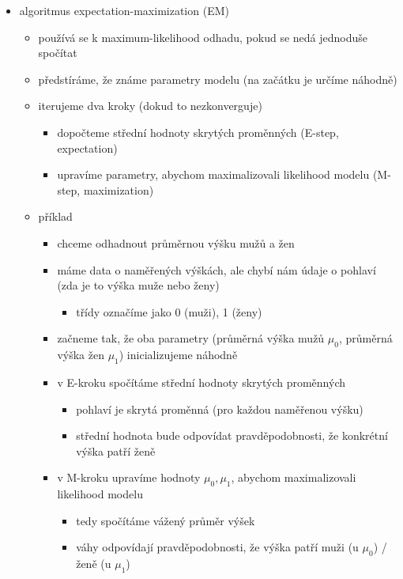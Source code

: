 \begin{itemize}
\begin{itemize}
\begin{itemize}
\begin{itemize}
\item $p(z\mid\mathrm{data})=\sum_h p(z\mid h)\cdot p(h\mid\mathrm{data})$
\end{itemize}
\end{itemize}
\item algoritmus expectation-maximization (EM)
\begin{itemize}
\item používá se k maximum-likelihood odhadu, pokud se nedá jednoduše spočítat
\item předstíráme, že známe parametry modelu (na začátku je určíme náhodně)
\item iterujeme dva kroky (dokud to nezkonverguje)
\begin{itemize}
\item dopočteme střední hodnoty skrytých proměnných (E-step, expectation)
\item upravíme parametry, abychom maximalizovali likelihood modelu (M-step, maximization)
\end{itemize}
\item příklad
\begin{itemize}
\item chceme odhadnout průměrnou výšku mužů a žen
\item máme data o naměřených výškách, ale chybí nám údaje o pohlaví (zda je to výška muže nebo ženy)
\begin{itemize}
\item třídy označíme jako 0 (muži), 1 (ženy)
\end{itemize}
\item začneme tak, že oba parametry (průměrná výška mužů $\mu_0$, průměrná výška žen $\mu_1$) inicializujeme náhodně
\item v E-kroku spočítáme střední hodnoty skrytých proměnných
\begin{itemize}
\item pohlaví je skrytá proměnná (pro každou naměřenou výšku)
\item střední hodnota bude odpovídat pravděpodobnosti, že konkrétní výška patří ženě
\end{itemize}
\item v M-kroku upravíme hodnoty $\mu_0,\mu_1$, abychom maximalizovali likelihood modelu
\begin{itemize}
\item tedy spočítáme vážený průměr výšek
\item váhy odpovídají pravděpodobnosti, že výška patří muži (u $\mu_0$) / ženě (u $\mu_1$)

\end{itemize}
\end{itemize}
\end{itemize}
\end{itemize}
\end{itemize}
